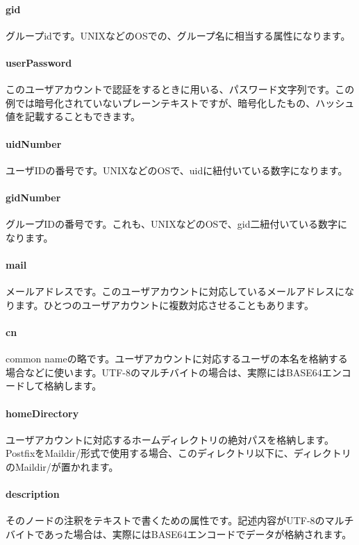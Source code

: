 \paragraph{gid}
グループidです。UNIXなどのOSでの、グループ名に相当する属性になります。

\paragraph{userPassword}
このユーザアカウントで認証をするときに用いる、パスワード文字列です。この例では暗号化されていないプレーンテキストですが、暗号化したもの、ハッシュ値を記載することもできます。

\paragraph{uidNumber}
ユーザIDの番号です。UNIXなどのOSで、uidに紐付いている数字になります。

\paragraph{gidNumber}
グループIDの番号です。これも、UNIXなどのOSで、gid二紐付いている数字になります。

\paragraph{mail}
メールアドレスです。このユーザアカウントに対応しているメールアドレスになります。ひとつのユーザアカウントに複数対応させることもあります。

\paragraph{cn}
common nameの略です。ユーザアカウントに対応するユーザの本名を格納する場合などに使います。UTF-8のマルチバイトの場合は、実際にはBASE64エンコードして格納します。

\paragraph{homeDirectory}
ユーザアカウントに対応するホームディレクトリの絶対パスを格納します。PostfixをMaildir/形式で使用する場合、このディレクトリ以下に、ディレクトリのMaildir/が置かれます。

\paragraph{description}
そのノードの注釈をテキストで書くための属性です。記述内容がUTF-8のマルチバイトであった場合は、実際にはBASE64エンコードでデータが格納されます。

